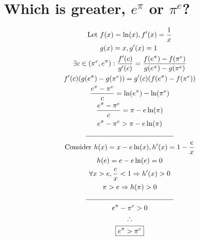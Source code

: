 \documentclass[letterpaper]{article}
\begin{document}
\section{Which is greater, $e^\pi$ or $\pi^e$?}
\begin{gather*}
	\begin{aligned}
		\text{Let } &f(x)=\ln(x), f'(x)=\frac{1}{x} \\
		& g(x)=x, g'(x)=1
	\end{aligned} \\
	\exists c\in(\pi^e,e^\pi):\frac{f'(c)}{g'(c)}=\frac{f(e^\pi)-f(\pi^e)}{g(e^\pi)-g(\pi^e)} \\
	f'(c)(g(e^\pi)-g(\pi^e))=g'(c)(f(e^\pi)-f(\pi^e)) \\
	\frac{e^\pi-\pi^e}{c}=\ln(e^\pi)-\ln(\pi^e) \\
	\frac{e^\pi-\pi^e}{c}=\pi-e\ln(\pi) \\
	e^\pi-\pi^e>\pi-e\ln(\pi) \\
	\line(1, 0){125} \\
	\text{Consider }h(x)=x-e\ln(x),h'(x)=1-\frac{e}{x} \\
	h(e)=e-e\ln(e)=0 \\
	\forall x>e, \frac{e}{x}<1\Rightarrow h'(x)>0 \\
	\pi>e\Rightarrow h(\pi)>0 \\
	\line(1, 0){125} \\
	e^\pi-\pi^e>0 \\
	\therefore \\
	\boxed{e^\pi>\pi^e}
\end{gather*}
\end{document}
